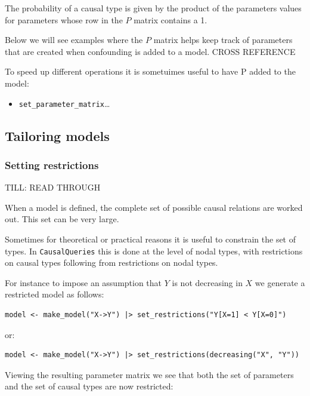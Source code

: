 \documentclass[
  article]{jss}
\providecommand{\tightlist}{%
  \setlength{\itemsep}{0pt}\setlength{\parskip}{0pt}}\usepackage{longtable,booktabs,array}
\begin{document}
The probability of a causal type is given by the product of the
parameters values for parameters whose row in the \(P\) matrix contains
a 1.

Below we will see examples where the \(P\) matrix helps keep track of
parameters that are created when confounding is added to a model. CROSS
REFERENCE

To speed up different operations it is sometuimes useful to have P added
to the model:

\begin{itemize}
\tightlist
\item
  \texttt{set\_parameter\_matrix}\ldots{}
\end{itemize}

\hypertarget{tailoring-models}{%
\subsection{Tailoring models}\label{tailoring-models}}

\hypertarget{restrictions}{%
\subsubsection{Setting restrictions}\label{restrictions}}

TILL: READ THROUGH

When a model is defined, the complete set of possible causal relations
are worked out. This set can be very large.

Sometimes for theoretical or practical reasons it is useful to constrain
the set of types. In \texttt{CausalQueries} this is done at the level of
nodal types, with restrictions on causal types following from
restrictions on nodal types.

For instance to impose an assumption that \(Y\) is not decreasing in
\(X\) we generate a restricted model as follows:

\begin{verbatim}
model <- make_model("X->Y") |> set_restrictions("Y[X=1] < Y[X=0]")
\end{verbatim}

or:

\begin{verbatim}
model <- make_model("X->Y") |> set_restrictions(decreasing("X", "Y"))
\end{verbatim}

Viewing the resulting parameter matrix we see that both the set of
parameters and the set of causal types are now restricted:
\end{document}
